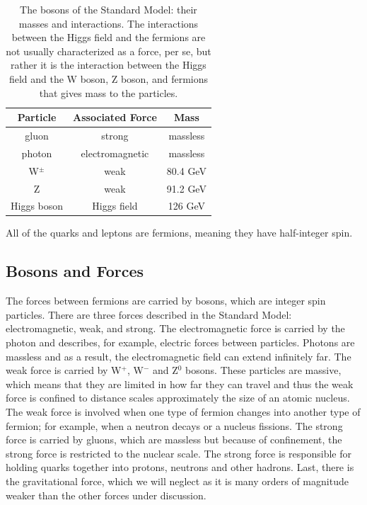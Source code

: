 \begin{table}
	\caption{The bosons of the Standard Model: their masses and interactions.   
    The interactions between the Higgs field and the fermions are not usually characterized as 
    a force, per se, but rather it is the interaction between the 
    Higgs field and the W boson, Z boson, and fermions that gives mass to the particles.  \label{tab:boson_table}}
    \center
	\begin{tabular}{| c || c | c |}
	\hline
	Particle & Associated Force & Mass \\
	\hline
	gluon & strong & massless \\
	photon & electromagnetic & massless \\
	W$^\pm$ & weak & 80.4 GeV \\
	Z & weak & 91.2 GeV \\ 
	Higgs boson & Higgs field & 126 GeV \\
	\hline
	\end{tabular}
\end{table}


All of the quarks and leptons are fermions, meaning they have half-integer spin.

\subsection{Bosons and Forces}

The forces between fermions are carried by bosons, which are integer spin particles.  
There are three forces described in the Standard Model: electromagnetic, weak, and 
strong.  The electromagnetic force is carried by the photon and describes, for example, 
electric forces between particles.  Photons are massless and as a result, the electromagnetic 
field can extend infinitely far.  The weak force is carried by W$^+$, 
W$^-$ and Z$^0$ bosons.  These particles are massive, which 
means that they are limited in how far they can travel and thus the weak 
force is confined to distance scales approximately the size of an atomic nucleus.  The 
weak force is involved when one type of fermion changes into another type of fermion; 
for example, when a neutron decays or a nucleus fissions.  The strong force 
is carried by gluons, which are massless but because of confinement, the strong 
force is restricted to the nuclear scale.  The strong force is responsible for holding 
quarks together into protons, neutrons and other hadrons. Last, there is the 
gravitational force, which we will neglect as it is many orders of magnitude weaker 
than the other forces under discussion.

